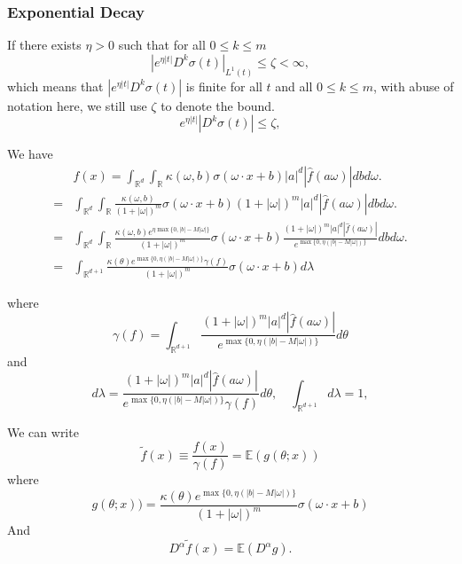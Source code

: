 \subsubsection{Exponential Decay}
If there exists $\eta>0$ such that for all $0\le k \le m$
$$
|e^{\eta|t|}D^{k}\sigma(t)|_{L^1(t)}\le \zeta<\infty,
$$
which means that $|e^{\eta|t|}D^{k}\sigma(t)|$ is finite for all $t$ and all $0\le k \le m$, with abuse of notation here, we still use $\zeta$ to denote the bound.
$$
e^{\eta|t|}|D^{k}\sigma(t)|\le \zeta,
$$

We have
\begin{equation}
	\begin{aligned}
		&f(x)=\int_{\mathbb{R}^{d}}\int_{\mathbb{R}}\kappa(\omega,b)\sigma(\omega\cdot x+b)|a|^d|\hat{f}(a\omega)|dbd\omega.\\
		=&\int_{\mathbb{R}^{d}}\int_{\mathbb{R}}\frac{\kappa(\omega,b)}{(1+|\omega|)^m}\sigma(\omega\cdot x+b)(1+|\omega|)^m|a|^d|\hat{f}(a\omega)|dbd\omega.\\
		=&\int_{\mathbb{R}^{d}}\int_{\mathbb{R}}\frac{\kappa(\omega,b)e^{\eta\max\{0,|b|-M|\omega|\}}}{(1+|\omega|)^m}\sigma(\omega\cdot x+b)\frac{(1+|\omega|)^m|a|^d|\hat{f}(a\omega)|}{e^{\max\{0,\eta(|b|-M|\omega|)\}}}dbd\omega.\\
		=&\int_{\mathbb{R}^{d+1}}\frac{\kappa(\theta)e^{\max\{0,\eta(|b|-M|\omega|)\}}\gamma(f)}{(1+|\omega|)^m}\sigma(\omega\cdot x+b) d\lambda
	\end{aligned}
\end{equation}

where
$$
\gamma(f)=\int_{\mathbb{R}^{d+1}}\frac{(1+|\omega|)^m|a|^d|\hat{f}(a\omega)|}{e^{\max\{0,\eta(|b|-M|\omega|)\}}}d\theta
$$
and
$$
d\lambda= \frac{(1+|\omega|)^m|a|^d|\hat{f}(a\omega)|}{e^{\max\{0,\eta(|b|-M|\omega|)\}}\gamma(f)}d\theta,\quad \int_{\mathbb{R}^{d+1}}d\lambda=1,
$$


We can write
\begin{equation}
	\tilde f(x)\equiv\frac{f(x)}{\gamma(f)}
	=\mathbb{E}(g(\theta; x))
\end{equation}
where
\begin{equation}
	\label{gx}
	g(\theta; x))
	=\frac{\kappa(\theta)e^{\max\{0,\eta(|b|-M|\omega|)\}}}{(1+|\omega|)^m}\sigma(\omega\cdot x+b)
\end{equation}
And 
\begin{equation}
	D^\alpha \tilde f(x)=\mathbb{E}(D^\alpha g).
\end{equation}

